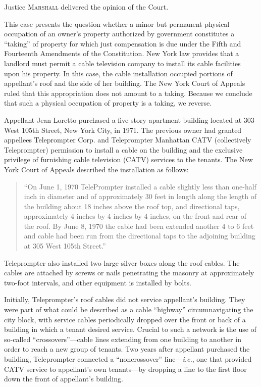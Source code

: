 

\opinion Justice \textsc{Marshall} delivered the opinion of the Court.

This case presents the question whether a minor but permanent physical
occupation of an owner's property authorized by government constitutes a
``taking'' of property for which just compensation is due under the Fifth and
Fourteenth Amendments of the Constitution. New York law provides that a landlord
must permit a cable television company to install its cable facilities upon his
property. In this case, the cable installation occupied portions of appellant's
roof and the side of her building. The New York Court of Appeals ruled that this
appropriation does not amount to a taking. Because we conclude that such a
physical occupation of property is a taking, we reverse.



Appellant Jean Loretto purchased a five-story apartment building located at 303
West 105th Street, New York City, in 1971. The previous owner had granted
appellees Teleprompter Corp. and Teleprompter Manhattan CATV (collectively
Teleprompter) permission to install a cable on the building and the exclusive
privilege of furnishing cable television (CATV) services to the tenants. The New
York Court of Appeals described the installation as follows:
\begin{quote}
``On June 1, 1970 TelePrompter installed a cable slightly less than one-half
inch in diameter and of approximately 30 feet in length along the length of the
building about 18 inches above the roof top, and directional taps, approximately
4 inches by 4 inches by 4 inches, on the front and rear of the roof. By June 8,
1970 the cable had been extended another 4 to 6 feet and cable had been run from
the directional taps to the adjoining building at 305 West 105th Street.''
\end{quote}

Teleprompter also installed two large silver boxes along the roof cables. The
cables are attached by screws or nails penetrating the masonry at approximately
two-foot intervals, and other equipment is installed by bolts.

Initially, Teleprompter's roof cables did not service appellant's building. They
were part of what could be described as a cable ``highway'' circumnavigating the
city block, with service cables periodically dropped over the front or back of a
building in which a tenant desired service. Crucial to such a network is the use
of so-called ``crossovers''---cable lines extending from one building to another
in order to reach a new group of tenants. Two years after appellant purchased
the building, Teleprompter connected a ``noncrossover'' line---\textit{i.e.},
one that provided CATV service to appellant's own tenants---by dropping a line
to the first floor down the front of appellant's building.

